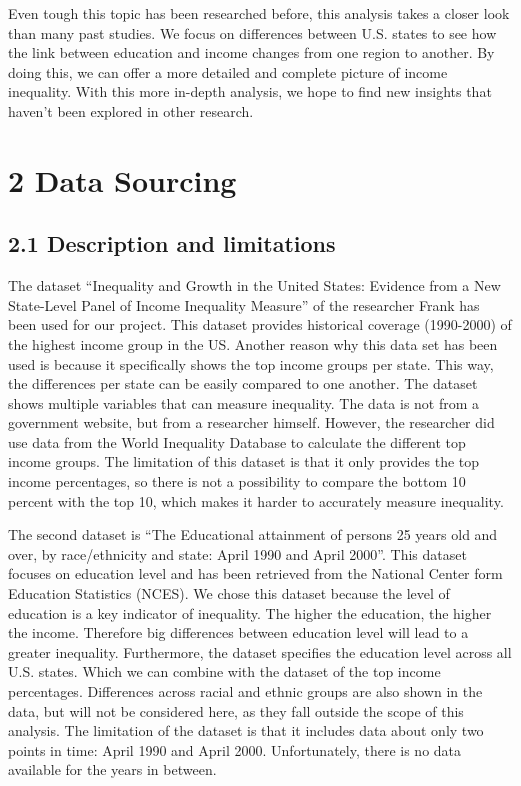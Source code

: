 \documentclass[
]{article}
\begin{document}
Even tough this topic has been researched before, this analysis takes a
closer look than many past studies. We focus on differences between U.S.
states to see how the link between education and income changes from one
region to another. By doing this, we can offer a more detailed and
complete picture of income inequality. With this more in-depth analysis,
we hope to find new insights that haven't been explored in other
research.

\section{2 Data Sourcing}\label{data-sourcing}

\subsection{2.1 Description and
limitations}\label{description-and-limitations}

The dataset ``Inequality and Growth in the United States: Evidence from
a New State-Level Panel of Income Inequality Measure'' of the researcher
Frank has been used for our project. This dataset provides historical
coverage (1990-2000) of the highest income group in the US. Another
reason why this data set has been used is because it specifically shows
the top income groups per state. This way, the differences per state can
be easily compared to one another. The dataset shows multiple variables
that can measure inequality. The data is not from a government website,
but from a researcher himself. However, the researcher did use data from
the World Inequality Database to calculate the different top income
groups. The limitation of this dataset is that it only provides the top
income percentages, so there is not a possibility to compare the bottom
10 percent with the top 10, which makes it harder to accurately measure
inequality.

The second dataset is ``The Educational attainment of persons 25 years
old and over, by race/ethnicity and state: April 1990 and April 2000''.
This dataset focuses on education level and has been retrieved from the
National Center form Education Statistics (NCES). We chose this dataset
because the level of education is a key indicator of inequality. The
higher the education, the higher the income. Therefore big differences
between education level will lead to a greater inequality. Furthermore,
the dataset specifies the education level across all U.S. states. Which
we can combine with the dataset of the top income percentages.
Differences across racial and ethnic groups are also shown in the data,
but will not be considered here, as they fall outside the scope of this
analysis. The limitation of the dataset is that it includes data about
only two points in time: April 1990 and April 2000. Unfortunately, there
is no data available for the years in between.
\end{document}
